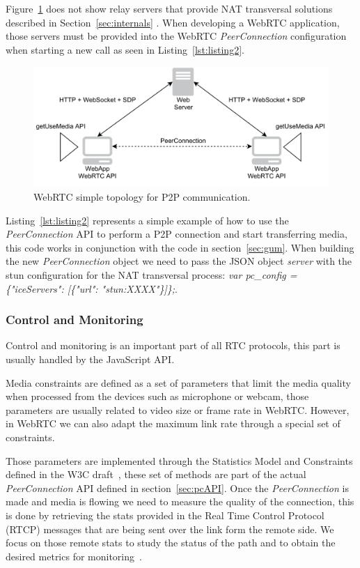 Figure~\ref{fig:webrtcExample} does not show relay servers that provide NAT transversal solutions described in Section~\ref{sec:internals} . When developing a WebRTC application, those servers must be provided into the WebRTC {\it PeerConnection} configuration when starting a new call as seen in Listing~\ref{lst:listing2}.

 \begin{figure}[h]
  \centering
    \includegraphics[width=1\textwidth]{./figures/webrtcExample.pdf}
      \caption[WebRTC simple topology for P2P communication]{WebRTC simple topology for P2P communication.}
	\label{fig:webrtcExample}
\end{figure}

Listing~\ref{lst:listing2} represents a simple example of how to use the {\it PeerConnection} API to perform a P2P connection and start transferring media, this code works in conjunction with the code in section~\ref{sec:gum}. When building the new {\it PeerConnection} object we need to pass the JSON object {\it server} with the stun configuration for the NAT transversal process: {\it var pc\_config = \{"iceServers": [\{"url": "stun:XXXX"\}]\};}. 

\subsubsection{Control and Monitoring}
\label{sec:constraints}

Control and monitoring is an important part of all RTC protocols, this part is usually handled by the JavaScript API.

Media constraints are defined as a set of parameters that limit the media quality when processed from the devices such as microphone or webcam, those parameters are usually related to video size or frame rate in WebRTC. However, in WebRTC we can also adapt the maximum link rate through a special set of constraints.

Those parameters are implemented through the Statistics Model and Constraints defined in the W3C draft~\cite{editorWebRTCdraft}, these set of methods are part of the actual {\it PeerConnection} API defined in section~\ref{sec:pcAPI}. Once the {\it PeerConnection} is made and media is flowing we need to measure the quality of the connection, this is done by retrieving the stats provided in the Real Time Control Protocol (RTCP)  messages that are being sent over the link form the remote side. We focus on those remote stats to study the status of the path and to obtain the desired metrics for monitoring~\cite{varunMetrics}. 

